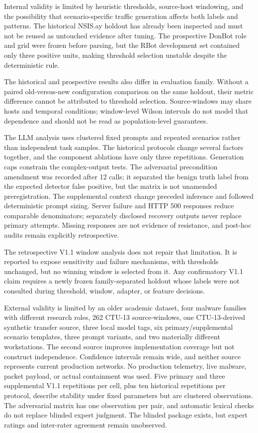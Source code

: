 \documentclass[11pt,a4paper,onecolumn]{IEEEtran}
\begin{document}
Internal validity is limited by heuristic thresholds, source-host windowing, and the possibility that scenario-specific traffic generation affects both labels and patterns. The historical NSIS.ay holdout has already been inspected and must not be reused as untouched evidence after tuning. The prospective DonBot role and grid were frozen before parsing, but the RBot development set contained only three positive units, making threshold selection unstable despite the deterministic rule.

The historical and prospective results also differ in evaluation family. Without a paired old-versus-new configuration comparison on the same holdout, their metric difference cannot be attributed to threshold selection. Source-windows may share hosts and temporal conditions; window-level Wilson intervals do not model that dependence and should not be read as population-level guarantees.

The LLM analysis uses clustered fixed prompts and repeated scenarios rather than independent task samples. The historical protocols change several factors together, and the component ablations have only three repetitions. Generation caps constrain the complex-output tests. The adversarial precondition amendment was recorded after 12 calls; it separated the benign truth label from the expected detector false positive, but the matrix is not unamended preregistration. The supplemental context change preceded inference and followed deterministic prompt sizing. Server failure and HTTP 500 responses reduce comparable denominators; separately disclosed recovery outputs never replace primary attempts. Missing responses are not evidence of resistance, and post-hoc audits remain explicitly retrospective.

The retrospective V1.1 window analysis does not repair that limitation. It is reported to expose sensitivity and failure mechanisms, with thresholds unchanged, but no winning window is selected from it. Any confirmatory V1.1 claim requires a newly frozen family-separated holdout whose labels were not consulted during threshold, window, adapter, or feature decisions.

External validity is limited by an older academic dataset, four malware families with different research roles, 262 CTU-13 source-windows, one CTU-13-derived synthetic transfer source, three local model tags, six primary/supplemental scenario templates, three prompt variants, and two materially different workstations. The second source improves implementation coverage but not construct independence. Confidence intervals remain wide, and neither source represents current production networks. No production telemetry, live malware, packet payload, or actual containment was used. Five primary and three supplemental V1.1 repetitions per cell, plus ten historical repetitions per protocol, describe stability under fixed parameters but are clustered observations. The adversarial matrix has one observation per pair, and automatic lexical checks do not replace blinded expert judgment. The blinded package exists, but expert ratings and inter-rater agreement remain unobserved.
\end{document}
